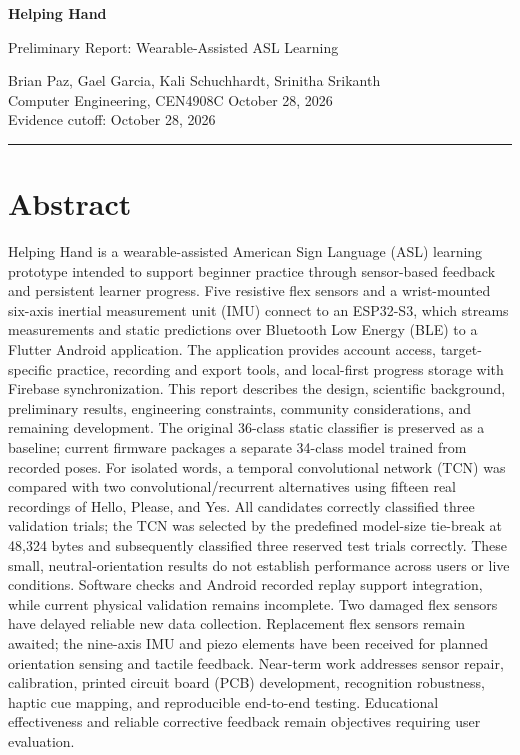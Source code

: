 \documentclass[11pt,letterpaper]{article}
\begin{document}
{\LARGE\bfseries\color{ink}Helping Hand\par}
{\large Preliminary Report: Wearable-Assisted ASL Learning\par}
\smallskip
{\small Brian Paz, Gael Garcia, Kali Schuchhardt, Srinitha Srikanth\\
Computer Engineering, CEN4908C \hfill October 28, 2026\\
Evidence cutoff: October 28, 2026\par}
\vspace{4pt}
\hrule
\vspace{5pt}

\section*{Abstract}
Helping Hand is a wearable-assisted American Sign Language (ASL) learning
prototype intended to support beginner practice through sensor-based feedback
and persistent learner progress. Five resistive flex sensors and a wrist-mounted
six-axis inertial measurement unit (IMU) connect to an ESP32-S3, which streams
measurements and static predictions over Bluetooth Low Energy (BLE) to a Flutter Android application.
The application provides account access, target-specific practice, recording
and export tools, and local-first progress storage with Firebase synchronization.
This report describes the design, scientific background, preliminary results,
engineering constraints, community considerations, and remaining development.
The original 36-class static classifier is preserved as a baseline; current
firmware packages a separate 34-class model trained from recorded poses.
For isolated words, a temporal convolutional network (TCN) was compared with
two convolutional/recurrent alternatives using fifteen real recordings of Hello,
Please, and Yes. All candidates correctly classified three validation trials;
the TCN was selected by the predefined model-size tie-break at 48,324 bytes
and subsequently classified three reserved test trials correctly. These small,
neutral-orientation results do not establish performance across users or live
conditions. Software checks and Android recorded replay support integration,
while current physical validation remains incomplete. Two damaged
flex sensors have delayed reliable new data collection. Replacement flex sensors
remain awaited; the nine-axis IMU and piezo elements have been received for
planned orientation sensing and tactile feedback. Near-term work addresses
sensor repair, calibration, printed circuit board (PCB) development, recognition robustness, haptic
cue mapping, and reproducible end-to-end testing. Educational effectiveness
and reliable corrective feedback remain objectives requiring user evaluation.
\end{document}
